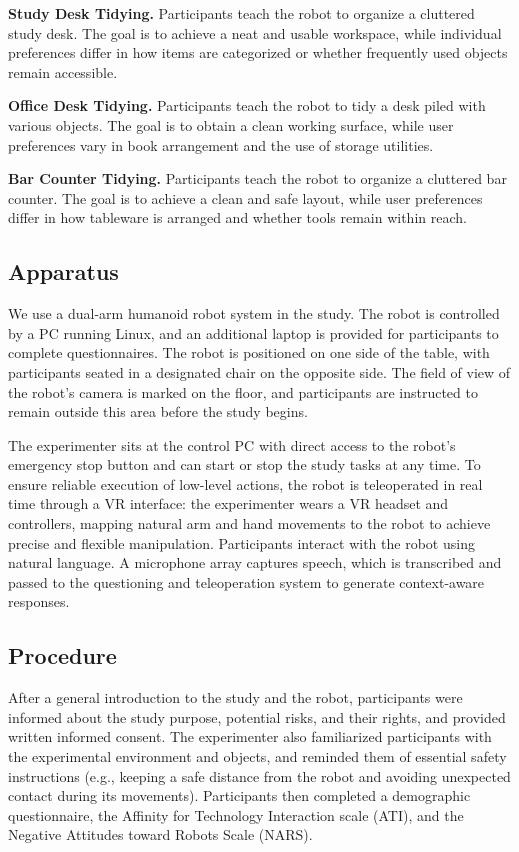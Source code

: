 \documentclass[sigconf,authordraft]{acmart}
\begin{document}
\textbf{Study Desk Tidying.} Participants teach the robot to organize a cluttered study desk. The goal is to achieve a neat and usable workspace, while individual preferences differ in how items are categorized or whether frequently used objects remain accessible.  

\textbf{Office Desk Tidying.} Participants teach the robot to tidy a desk piled with various objects. The goal is to obtain a clean working surface, while user preferences vary in book arrangement and the use of storage utilities.  

\textbf{Bar Counter Tidying.} Participants teach the robot to organize a cluttered bar counter. The goal is to achieve a clean and safe layout, while user preferences differ in how tableware is arranged and whether tools remain within reach.  
 
\subsection{Apparatus}
We use a dual-arm humanoid robot system in the study. The robot is controlled by a PC running Linux, and an additional laptop is provided for participants to complete questionnaires. The robot is positioned on one side of the table, with participants seated in a designated chair on the opposite side. The field of view of the robot’s camera is marked on the floor, and participants are instructed to remain outside this area before the study begins.  

The experimenter sits at the control PC with direct access to the robot’s emergency stop button and can start or stop the study tasks at any time. To ensure reliable execution of low-level actions, the robot is teleoperated in real time through a VR interface: the experimenter wears a VR headset and controllers, mapping natural arm and hand movements to the robot to achieve precise and flexible manipulation.  Participants interact with the robot using natural language. A microphone array captures speech, which is transcribed and passed to the questioning and teleoperation system to generate context-aware responses.


 

\subsection{Procedure}
After a general introduction to the study and the robot, participants were informed about the study purpose, potential risks, and their rights, and provided written informed consent. The experimenter also familiarized participants with the experimental environment and objects, and reminded them of essential safety instructions (e.g., keeping a safe distance from the robot and avoiding unexpected contact during its movements). Participants then completed a demographic questionnaire, the Affinity for Technology Interaction scale (ATI), and the Negative Attitudes toward Robots Scale (NARS). 
\end{document}
